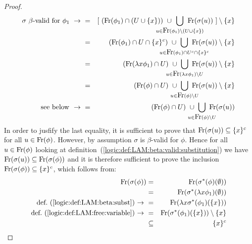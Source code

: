 \begin{proof}
\begin{eqnarray*}
        \mbox{$\sigma$ $\beta$-valid for $\phi_{1}\ \rightarrow\ $}
        &=& [\ (\free(\phi_{1})\cap(U\cup\{x\}))
        \ \cup\ 
        \!\!\!\!\!\!\!\!\!\!\!\!\!\!\!\!\!
        \bigcup_{u\in\free(\phi_{1})\setminus(U\cup\{x\})}
        \!\!\!\!\!\!\!\!\!\!\!\!\!\!\!
        \free(\sigma(u))
        \ ]\setminus\{x\}\\
        &=&(\free(\phi_{1})\cap U\cap \{x\}^{c})
        \ \cup\ 
        \!\!\!\!\!\!\!\!\!\!\!\!\!\!\!\!\!\!
        \bigcup_{u\in\free(\phi_{1})\cap U^{c}\cap\{x\}^{c}}
        \!\!\!\!\!\!\!\!\!\!\!\!\!\!\!\!
        \free(\sigma(u))\setminus\{x\}\\
        &=&(\free(\lambda x\phi_{1})\cap U)
        \ \cup\ 
        \!\!\!\!\!\!\!\!\!\!\!\!\!
        \bigcup_{u\in\free(\lambda x\phi_{1})\setminus U}
        \!\!\!\!\!\!\!\!\!\!\!
        \free(\sigma(u))\setminus\{x\}\\
        &=&(\free(\phi)\cap U)
        \ \cup\ 
        \!\!\!\!\!\!\!\!\!
        \bigcup_{u\in\free(\phi)\setminus U} 
        \!\!\!\!\!\!\!
        \free(\sigma(u))\setminus\{x\}\\
        \mbox{see below $\ \rightarrow\ $}
        &=&(\free(\phi)\cap U)
        \ \cup\ 
        \!\!\!\!\!\!\!\!\!
        \bigcup_{u\in\free(\phi)\setminus U}
        \!\!\!\!\!\!\!
        \free(\sigma(u))
    \end{eqnarray*}
    In order to jusfify the last equality, it is sufficient to prove
    that $\mbox{\rm Fr}(\sigma(u))\subseteq\{x\}^{c}$ for all $u\in\mbox{\rm Fr}(\phi)$.
    However, by assumption $\sigma$ is $\beta$-valid for $\phi$. Hence
    for all $u\in\mbox{\rm Fr}(\phi)$ looking at 
    definition~(\ref{logic:def:LAM:beta:valid:substitution}) we have 
    $\mbox{\rm Fr}(\sigma(u))\subseteq\mbox{\rm Fr}(\sigma(\phi))$ and it is therefore 
    sufficient to prove the inclusion $\mbox{\rm Fr}(\sigma(\phi))\subseteq\{x\}^{c}$,
    which follows from:
    \begin{eqnarray*}
        \mbox{\rm Fr}(\sigma(\phi))
        &=&\mbox{\rm Fr}(\sigma^{*}(\phi)(\emptyset))\\
        &=&\mbox{\rm Fr}(\sigma^{*}(\lambda x\phi_{1})(\emptyset))\\
        \mbox{def.~(\ref{logic:def:LAM:beta:subst})$\ \rightarrow\ $}
        &=&\mbox{\rm Fr}(\lambda x \sigma^{*}(\phi_{1})(\{x\}))\\
        \mbox{def.~(\ref{logic:def:LAM:free:variable})$\ \rightarrow\ $}
        &=&\mbox{\rm Fr}(\sigma^{*}(\phi_{1})(\{x\}))\setminus\{x\}\\
        &\subseteq&\{x\}^{c}
    \end{eqnarray*}
\end{proof}

